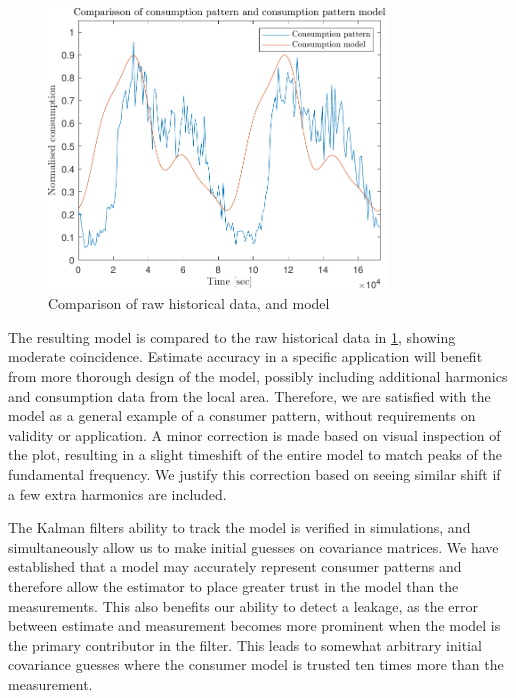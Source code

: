 \begin{figure}[h!]
	\centering
	\includegraphics[width=0.8\textwidth]{Pictures/Comparisson.pdf}
	
	\caption{Comparison of raw historical data, and model}
	\label{fig:Comparison}
\end{figure}

The resulting model is compared to the raw historical data in \cref{fig:Comparison}, showing moderate coincidence. Estimate accuracy in a specific application will benefit from more thorough design of the model, possibly including additional harmonics and consumption data from the local area. Therefore, we are satisfied with the model as a general example of a consumer pattern, without requirements on validity or application. A minor correction is made based on visual inspection of the plot, resulting in a slight timeshift of the entire model to match peaks of the fundamental frequency. We justify this correction based on seeing similar shift if a few extra harmonics are included.


The Kalman filters ability to track the model is verified in simulations, and simultaneously allow us to make initial guesses on covariance matrices. We have established that a model may accurately represent consumer patterns and therefore allow the estimator to place greater trust in the model than the measurements. This also benefits our ability to detect a leakage, as the error between estimate and measurement becomes more prominent when the model is the primary contributor in the filter. This leads to somewhat arbitrary initial covariance guesses where the consumer model is trusted ten times more than the measurement.

